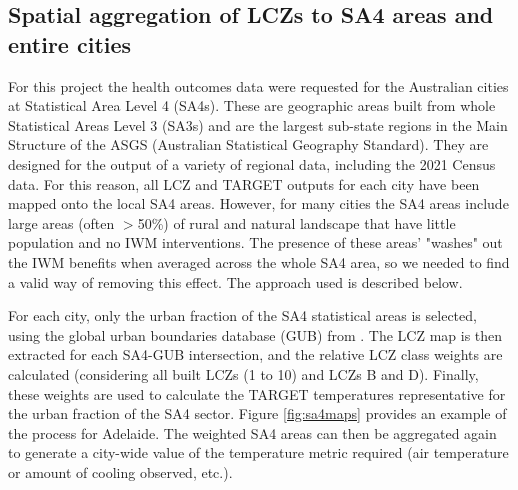 \documentclass[final,3p,times,authoryear]{elsarticle}
\begin{document}
\subsection{Spatial aggregation of LCZs to SA4 areas and entire cities}

For this project the health outcomes data were requested for the Australian cities at Statistical Area Level 4 (SA4s). These are geographic areas built from whole Statistical Areas Level 3 (SA3s) and are the largest sub-state regions in the Main Structure of the ASGS (Australian Statistical Geography Standard). They are designed for the output of a variety of regional data, including the 2021 Census data. For this reason, all LCZ and TARGET outputs for each city have been mapped onto the local SA4 areas. However, for many cities the SA4 areas include large areas (often $>$50\%) of rural and natural landscape that have little population and no IWM interventions. The presence of these areas' "washes" out the IWM benefits when averaged across the whole SA4 area, so we needed to find a valid way of removing this effect. The approach used is described below.

For each city, only the urban fraction of the SA4 statistical areas is selected, using the global urban boundaries database (GUB) from \cite{Li2020b}. The LCZ map is then extracted for each SA4-GUB intersection, and the relative LCZ class weights are calculated (considering all built LCZs (1 to 10) and LCZs B and D). Finally, these weights are used to calculate the TARGET temperatures representative for the urban fraction of the SA4 sector. Figure \ref{fig:sa4maps} provides an example of the process for Adelaide. The weighted SA4 areas can then be aggregated again to generate a city-wide value of the temperature metric required (air temperature or amount of cooling observed, etc.).
\end{document}
